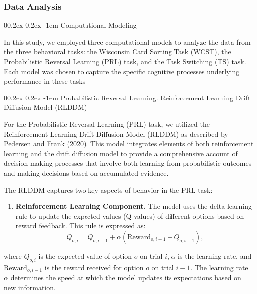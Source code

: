 \documentclass[
  man]{apa6}
\makeatletter
\providecommand{\tightlist}{%
  \setlength{\itemsep}{0pt}\setlength{\parskip}{0pt}}
\let\oldparagraph\paragraph
\renewcommand{\paragraph}{
    \@ifstar
      \xxxParagraphStar
      \xxxParagraphNoStar
  }
\newcommand{\xxxParagraphStar}[1]{\oldparagraph*{#1}\mbox{}}
\newcommand{\xxxParagraphNoStar}[1]{\oldparagraph{#1}\mbox{}}
\renewcommand{\paragraph}{\@startsection{paragraph}{4}{\parindent}%
  {0\baselineskip \@plus 0.2ex \@minus 0.2ex}%
  {-1em}%
  {\normalfont\normalsize\bfseries\itshape\typesectitle}}
\makeatother
\begin{document}
\subsubsection{Data Analysis}\label{data-analysis-2}

\paragraph{Computational Modeling}\label{computational-modeling-1}

In this study, we employed three computational models to analyze the data from the three behavioral tasks: the Wisconsin Card Sorting Task (WCST), the Probabilistic Reversal Learning (PRL) task, and the Task Switching (TS) task. Each model was chosen to capture the specific cognitive processes underlying performance in these tasks.

\paragraph{Probabilistic Reversal Learning: Reinforcement Learning Drift Diffusion Model (RLDDM)}\label{probabilistic-reversal-learning-reinforcement-learning-drift-diffusion-model-rlddm}

For the Probabilistic Reversal Learning (PRL) task, we utilized the Reinforcement Learning Drift Diffusion Model (RLDDM) as described by Pedersen and Frank (2020). This model integrates elements of both reinforcement learning and the drift diffusion model to provide a comprehensive account of decision-making processes that involve both learning from probabilistic outcomes and making decisions based on accumulated evidence.

The RLDDM captures two key aspects of behavior in the PRL task:

\begin{enumerate}
\def\labelenumi{\arabic{enumi}.}
\tightlist
\item
  \textbf{Reinforcement Learning Component.} The model uses the delta learning rule to update the expected values (Q-values) of different options based on reward feedback. This rule is expressed as:
  \[
    Q_{o,i} = Q_{o,i-1} + \alpha ( \text{Reward}_{o,i-1} - Q_{o,i-1} ),
    \]
\end{enumerate}

where \(Q_{o,i}\) is the expected value of option \(o\) on trial \(i\), \(\alpha\) is the learning rate, and \(\text{Reward}_{o,i-1}\) is the reward received for option \(o\) on trial \(i-1\). The learning rate \(\alpha\) determines the speed at which the model updates its expectations based on new information.
\end{document}
